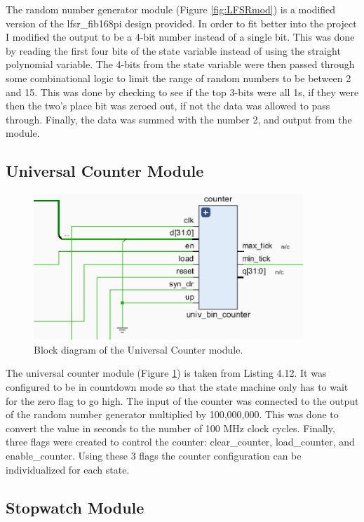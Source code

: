 \documentclass[11pt]{article}
\begin{document}
The random number generator module (Figure \ref{fig:LFSRmod}) is a modified version of the lfsr\_fib168pi design provided. In order to fit better into the project I modified the output to be a 4-bit number instead of a single bit. This was done by reading the first four bits of the state variable instead of using the straight polynomial variable. The 4-bits from the state variable were then passed through some combinational logic to limit the range of random numbers to be between 2 and 15. This was done by checking to see if the top 3-bits were all 1s, if they were then the two's place bit was zeroed out, if not the data was allowed to pass through. Finally, the data was summed with the number 2, and output from the module.

\subsection{Universal Counter Module}

\begin{figure}[H]
\includegraphics [width=4in]{./figures/counter.eps}
	\centering
	\caption{Block diagram of the Universal Counter module.}
	\label{fig:counterMod}
\end{figure}

The universal counter module (Figure \ref{fig:counterMod}) is taken from Listing 4.12. It was configured to be in countdown mode so that the state machine only has to wait for the zero flag to go high. The input of the counter was connected to the output of the random number generator multiplied by 100,000,000. This was done to convert the value in seconds to the number of 100 MHz clock cycles. Finally, three flags were created to control the counter: clear\_counter, load\_counter, and enable\_counter. Using these 3 flags the counter configuration can be individualized for each state.

\subsection{Stopwatch Module}
\end{document}
